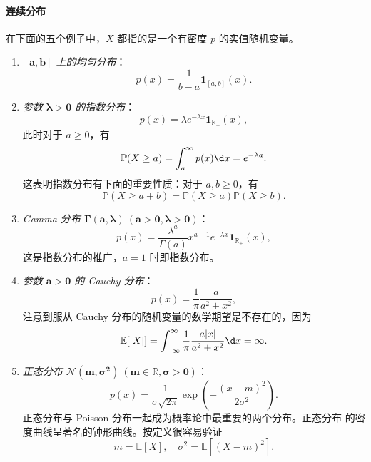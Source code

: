 \documentclass[fontset=none]{Notes}
\newcommand{\indicator}[1]{\mathbold 1_{#1}}
\begin{document}
\paragraph{连续分布}
在下面的五个例子中，$X$ 都指的是一个有密度 $p$ 的实值随机变量。
\begin{enumerate}
  \item \emph{$\mathbold{[a,b]}$ 上的均匀分布}：
  \[
    p(x)=\frac{1}{b-a}\indicator{[a,b]}(x).  
  \]
  \item \emph{参数 $\mathbold{\lambda>0}$ 的指数分布}：
  \[
    p(x)=\lambda e^{-\lambda x}\indicator{\mathbb{R}_+}(x),  
  \]
  此时对于 $a\geq 0$，有
  \[
    \mathbb{P}(X\geq a)=\int_a^\infty p(x)\d x=
    e^{-\lambda a}.  
  \]
  这表明指数分布有下面的重要性质：对于 $a,b\geq 0$，有
  \begin{equation}
    \mathbb{P}(X\geq a+b)=\mathbb{P}(X\geq a)\mathbb{P}(X\geq b).
  \end{equation}
  \item \emph{Gamma 分布 $\mathbold{\Gamma(a,\lambda)\ (a>0,\lambda>0)}$}：
  \[
    p(x)=\frac{\lambda^a}{\Gamma(a)}x^{a-1}e^{-\lambda x}\indicator{\mathbb{R}_+}(x),  
  \]
  这是指数分布的推广，$a=1$ 时即指数分布。
  \item \emph{参数 $\mathbold{a>0}$ 的 Cauchy 分布}：
  \[
    p(x)=\frac{1}{\pi}\frac{a}{a^2+x^2} , 
  \]
  注意到服从 Cauchy 分布的随机变量的数学期望是不存在的，因为
  \[
    \mathbb{E}[|X|]=\int_{-\infty}^{\infty}\frac{1}{\pi}\frac{a|x|}{a^2+x^2}\d x=\infty.  
  \]
  \item \emph{正态分布 $\mathbold{\mathcal{N}(m,\sigma^2)\ (m\in \mathbb{R},\sigma>0)}$}：
  \[
    p(x)=\frac{1}{\sigma\sqrt{2\pi}}\exp\left(-\frac{(x-m)^2}{2\sigma^2}\right)  .
  \]
  正态分布与 Poisson 分布一起成为概率论中最重要的两个分布。正态分布
  的密度曲线呈著名的钟形曲线。按定义很容易验证
  \[
    m=\mathbb{E}[X],\quad \sigma^2 =\mathbb{E}[(X-m)^2]. 
  \]
\end{enumerate}
\end{document}
